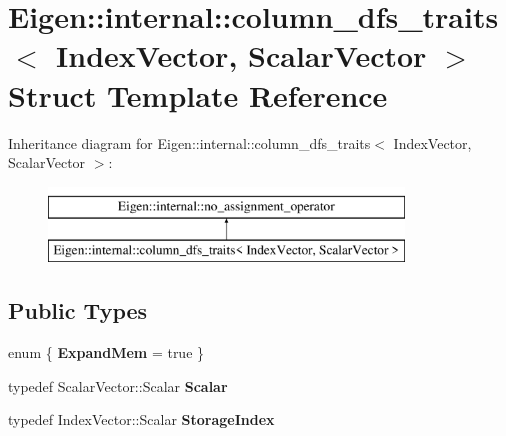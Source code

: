 \hypertarget{struct_eigen_1_1internal_1_1column__dfs__traits}{}\section{Eigen\+::internal\+::column\+\_\+dfs\+\_\+traits$<$ Index\+Vector, Scalar\+Vector $>$ Struct Template Reference}
\label{struct_eigen_1_1internal_1_1column__dfs__traits}
Inheritance diagram for Eigen\+::internal\+::column\+\_\+dfs\+\_\+traits$<$ Index\+Vector, Scalar\+Vector $>$\+:\begin{figure}[H]
\begin{center}
\leavevmode
\includegraphics[height=2.000000cm]{struct_eigen_1_1internal_1_1column__dfs__traits}
\end{center}
\end{figure}
\subsection*{Public Types}
\begin{DoxyCompactItemize}
\item 
\mbox{\label{struct_eigen_1_1internal_1_1column__dfs__traits_abc28a09a5719ee72658d56f6fbd39b5a}} 
enum \{ {\bfseries Expand\+Mem} = true
 \}
\item 
\mbox{\label{struct_eigen_1_1internal_1_1column__dfs__traits_a8adc38f8b5e97c0ab3c8a90b1fd5cb9b}} 
typedef Scalar\+Vector\+::\+Scalar {\bfseries Scalar}
\item 
\mbox{\label{struct_eigen_1_1internal_1_1column__dfs__traits_a7c5616d5178c49c1374613aefa1d68ec}} 
typedef Index\+Vector\+::\+Scalar {\bfseries Storage\+Index}
\end{DoxyCompactItemize}
